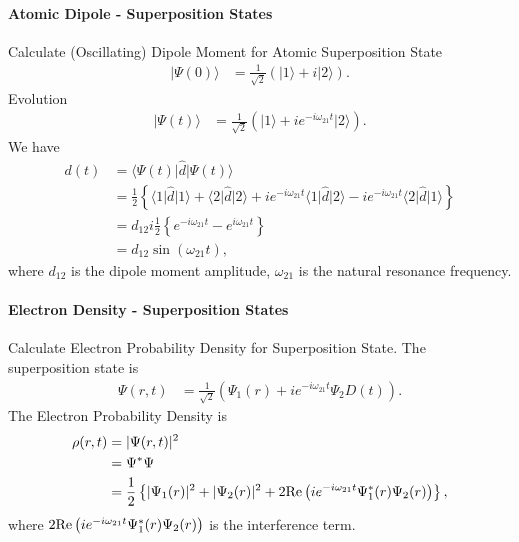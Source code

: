 \documentclass[../../note.tex]{subfiles}
\begin{document}
\paragraph{Atomic Dipole - Superposition States}
Calculate (Oscillating) Dipole Moment for Atomic Superposition State 
\begin{align}
    \vert \Psi(0) \rangle
    &= \frac{1}{\sqrt{2}}(\vert 1 \rangle + i \vert 2 \rangle).
\end{align}
Evolution
\begin{align}
    \vert \Psi(t) \rangle
    &= \frac{1}{\sqrt{2}}(\vert 1 \rangle + i e^{- i \omega_{21} t} \vert 2 \rangle).
\end{align}
We have
\begin{align}
    d(t)
    &= \langle \Psi(t) \vert \hat{d} \vert \Psi(t) \rangle \\
    &= \frac{1}{2}\left\{\langle 1 \vert \hat{d} \vert 1 \rangle + \langle 2 \vert \hat{d} \vert 2 \rangle + i e^{-i\omega_{21} t} \langle 1 \vert \hat{d} \vert 2 \rangle - i e^{-i\omega_{21} t} \langle 2 \vert \hat{d} \vert 1 \rangle\right\} \\
    &= d_{12} i \frac{1}{2} \left\{e^{-i \omega_{21} t} - e^{i \omega_{21} t}\right\} \\
    &= d_{12} \sin(\omega_{21} t),
\end{align}
where $d_{12}$ is the dipole moment amplitude, $\omega_{21}$ is the natural resonance frequency.

\paragraph{Electron Density - Superposition States}
Calculate Electron Probability Density for Superposition State. The superposition state is
\begin{align}
    \Psi(r,t)
    &= \frac{1}{\sqrt{2}} \left(\Psi_1(r) + i e^{-i \omega_{21} t} \Psi_2D(t) \right).
\end{align}
The Electron Probability Density is
\begin{align}
    \rho(r, t)
    &= \vert \Psi(r, t) \vert^2 \\
    &= \Psi^\ast \Psi \\
    &= \frac{1}{2} \left\{\vert \Psi_1(r) \vert^2 + \vert \Psi_2(r) \vert^2 + 2{\rm Re}\left(i e^{-i \omega_{21} t} \Psi_1^*(r) \Psi_2(r)\right)\right\},
\end{align}
where $2{\rm Re}\left(i e^{-i \omega_{21} t} \Psi_1^*(r) \Psi_2(r)\right)$ is the interference term.
\end{document}
